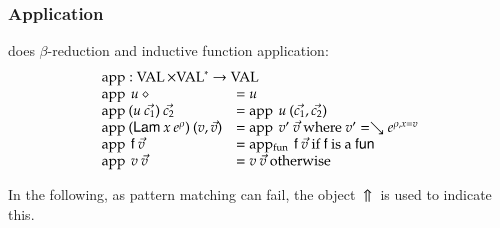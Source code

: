 \subsubsection{Application}
does $\beta$-reduction and inductive function application:
\[
\begin{array}{ll}
\multicolumn{2}{l}{\ap : \Val \times \ves{\Val} \ra \Val}\\
\ap \: u \: \diamond & = u \\
\ap \: (u \: \vec{c_1}) \: \vec{c_2} & = \ap \: u \: (\vec{c_1},\vec{c_2})\\
\ap \: (\vlam \: x \: \cl{e}{\rho}) \: (v,\vec{v}) & = \ap \: v' \: \vec{v} \mbox{ where } v' = \wh \cl{e}{\ins{\rho}{x}{v}} \\ 
\ap \: \ff \: \vec{v} & = \apf \: \ff \: \vec{v} \mbox{ if } \ff \mbox{ is a } \fun \\ 
\ap \: v \: \vec{v} & = v \: \vec{v} \mbox{ otherwise } \\
\end{array}
\]

In the following, as pattern matching can fail, the object $\: \Uparrow \:$ is used to indicate this. 


